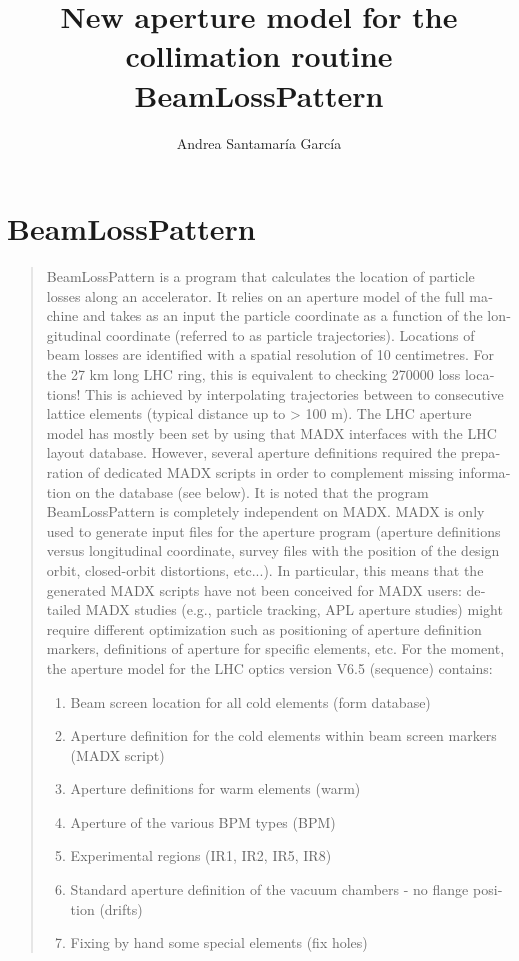 \documentclass[11pt]{article}
\title{New aperture model for the collimation routine BeamLossPattern}
\author{Andrea Santamar\'ia Garc\'ia}
\begin{document}
\hypersetup{linkbordercolor=blue}
\maketitle
\tableofcontents

\section{BeamLossPattern}
\begin{mdframed}[style=MyFrame]
\hyphenblockcquote{english}{website}{
BeamLossPattern is a program that calculates the location of particle losses along an accelerator. It relies on an aperture model of the full machine and takes as an input the particle coordinate as a function of the longitudinal coordinate (referred to as particle trajectories). 
Locations of beam losses are identified with a spatial resolution of 10 centimetres. For the 27 km long LHC ring, this is equivalent to checking 270000 loss locations! This is achieved by interpolating trajectories between to consecutive lattice elements (typical distance up to > 100 m).
The LHC aperture model has mostly been set by using that MADX interfaces with the LHC layout database. However, several aperture definitions required the preparation of dedicated MADX scripts in order to complement missing information on the database (see below).
It is noted that the program BeamLossPattern is completely independent on MADX. MADX is only used to generate input files for the aperture program (aperture definitions versus longitudinal coordinate, survey files with the position of the design orbit, closed-orbit distortions, etc...). In particular, this means that the generated MADX scripts have not been conceived for MADX users: detailed MADX studies (e.g., particle tracking, APL aperture studies) might require different optimization such as positioning of aperture definition markers, definitions of aperture for specific elements, etc.
For the moment, the aperture model for the LHC optics version V6.5 (sequence) contains:

\begin{enumerate}
\item Beam screen location for all cold elements (form database)
\item Aperture definition for the cold elements within beam screen markers (MADX script)
\item Aperture definitions for warm elements (warm)
\item Aperture of the various BPM types (BPM)
\item Experimental regions (IR1, IR2, IR5, IR8)
\item Standard aperture definition of the vacuum chambers - no flange position (drifts)
\item Fixing by hand some special elements (fix holes)
\end{enumerate}

}
\end{mdframed}
\end{document}
